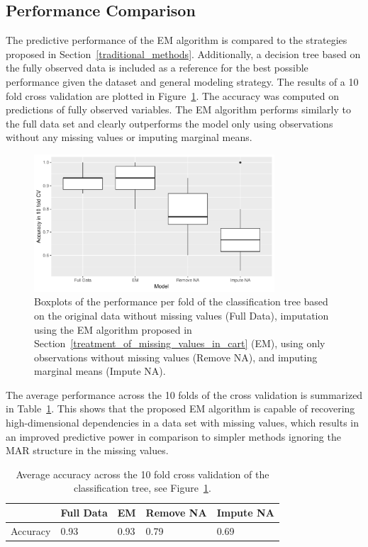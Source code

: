 \documentclass[12pt, twoside]{article}
\newcommand{\1}{\mathbb{1}}
\begin{document}
\subsection{Performance Comparison}\label{performance_comparison}
The predictive performance of the EM algorithm is compared to the strategies proposed in Section~\ref{traditional_methods}. Additionally, a decision tree based on the fully observed data is included as a reference for the best possible performance given the dataset and general modeling strategy. 
The results of a 10 fold cross validation are plotted in Figure~\ref{fig:performance}. The accuracy was computed on predictions of fully observed variables.
The EM algorithm performs similarly to the full data set and clearly outperforms the model only using observations without any missing values or imputing marginal means.
%
\begin{figure}[hp]
	\centering
	\includegraphics[width=0.8\textwidth]{plots/performance.pdf}
	\caption{Boxplots of the performance per fold of the classification tree based on the original data without missing values (Full Data), imputation using the EM algorithm proposed in Section~\ref{treatment_of_missing_values_in_cart} (EM), using only observations without missing values (Remove NA), and imputing marginal means (Impute NA).}
	\label{fig:performance}
\end{figure}
%
The average performance across the 10 folds of the cross validation is summarized in Table~\ref{tab:performance}. This shows that the proposed EM algorithm is capable of recovering high-dimensional dependencies in a data set with missing values, which results in an improved predictive power in comparison to simpler methods ignoring the MAR structure in the missing values.
\begin{table}[ht]
\caption{Average accuracy across the 10 fold cross validation 
of the classification tree, see Figure~\ref{fig:performance}.}
\centering
\begin{tabular}{r|llll}
 & Full Data & EM & Remove NA & Impute NA \\ 
\hline 
Accuracy & 0.93 &  0.93 &  0.79 &  0.69
\end{tabular}
\label{tab:performance}
\end{table}
\end{document}
